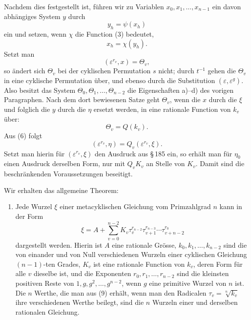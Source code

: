 \documentclass[11pt]{article}
\begin{document}
Nachdem dies festgestellt ist, f\"uhren wir zu Variablen $x_0,x_1,\ldots,x_{n-1}$ ein davon abh\"angiges System $y$ durch
\begin{equation}\tag{4}
  y_h=\psi(x_h)
\end{equation}
ein und setzen, wenn $\chi$ die Function (3) bedeutet,
\begin{equation}\tag{5}
  x_h=\chi(y_h).
\end{equation}
Setzt man
\begin{equation}\tag{6}
  (\varepsilon^{r_v},x)=\Theta_v,
\end{equation}
so \"andert sich $\Theta_v$ bei der cyklischen Permutation $s$ nicht; durch $t^{-1}$ gehen die $\Theta_v$ in eine cyklische Permutation \"uber, und ebenso durch die Substitution $(\varepsilon,\varepsilon^g)$. Also besitzt das System $\Theta_0,\Theta_1,\ldots,\Theta_{n-2}$ die Eigenschaften a)--d) des vorigen Paragraphen. Nach dem dort bewiesenen Satze geht $\Theta_v$, wenn die $x$ durch die $\xi$ und folglich die $y$ durch die $\eta$ ersetzt werden, in eine rationale Function von $k_v$ \"uber:
\begin{equation}\tag{7}
  \Theta_v=Q(k_v).
\end{equation}
Aus (6) folgt
\begin{equation}\tag{8}
  (\varepsilon^{r_v},\eta)=Q_v(\varepsilon^{r_v},\xi).
\end{equation}
Setzt man hierin f\"ur $(\varepsilon^{r_v},\xi)$ den Ausdruck aus \S\,185 ein, so erh\"alt man f\"ur $\eta_0$ einen Ausdruck derselben Form, nur mit $Q_vK_v$ an Stelle von $K_v$. Damit sind die beschr\"ankenden Voraussetzungen beseitigt.

Wir erhalten das allgemeine Theorem:

\begin{enumerate}[label=\Roman*.]
\item Jede Wurzel $\xi$ einer metacyklischen Gleichung vom Primzahlgrad $n$ kann in der Form
\begin{equation}\tag{9}
  \xi=A+
  \sum_{v=0}^{n-2}K_v\tau_v^{r_{n-2}}\tau_{v+1}^{r_{n-3}}\cdots\tau_{v+n-2}^{r_0}
\end{equation}
dargestellt werden. Hierin ist $A$ eine rationale Gr\"osse, $k_0,k_1,\ldots,k_{n-2}$ sind die von einander und von Null verschiedenen Wurzeln einer cyklischen Gleichung $(n-1)$-ten Grades, $K_v$ ist eine rationale Function von $k_v$, deren Form f\"ur alle $v$ dieselbe ist, und die Exponenten $r_0,r_1,\ldots,r_{n-2}$ sind die kleinsten positiven Reste von $1,g,g^2,\ldots,g^{n-2}$, wenn $g$ eine primitive Wurzel von $n$ ist. Die $n$ Werthe, die man aus (9) erh\"alt, wenn man den Radicalen $\tau_v=\sqrt[n]{k_v}$ ihre verschiedenen Werthe beilegt, sind die $n$ Wurzeln einer und derselben rationalen Gleichung.
\end{enumerate}
\end{document}
